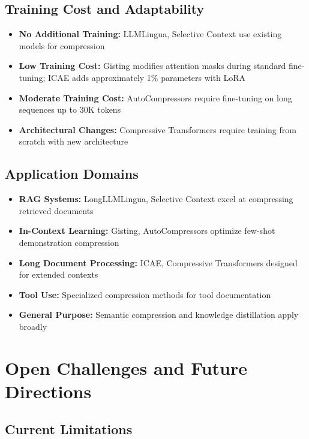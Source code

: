 \documentclass[11pt]{article}
\begin{document}
\subsection{Training Cost and Adaptability}

\begin{itemize}[leftmargin=*]
    \item \textbf{No Additional Training:} LLMLingua, Selective Context use existing models for compression
    \item \textbf{Low Training Cost:} Gisting modifies attention masks during standard fine-tuning; ICAE adds approximately 1\% parameters with LoRA
    \item \textbf{Moderate Training Cost:} AutoCompressors require fine-tuning on long sequences up to 30K tokens
    \item \textbf{Architectural Changes:} Compressive Transformers require training from scratch with new architecture
\end{itemize}

\subsection{Application Domains}

\begin{itemize}[leftmargin=*]
    \item \textbf{RAG Systems:} LongLLMLingua, Selective Context excel at compressing retrieved documents
    \item \textbf{In-Context Learning:} Gisting, AutoCompressors optimize few-shot demonstration compression
    \item \textbf{Long Document Processing:} ICAE, Compressive Transformers designed for extended contexts
    \item \textbf{Tool Use:} Specialized compression methods for tool documentation
    \item \textbf{General Purpose:} Semantic compression and knowledge distillation apply broadly
\end{itemize}

\section{Open Challenges and Future Directions}

\subsection{Current Limitations}
\end{document}
